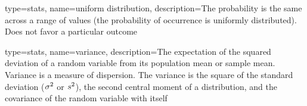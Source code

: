 {
	type=stats,
    name=uniform distribution,
    description={The probability is the same across a range of values (the probability of occurrence is uniformly distributed).  Does not favor a particular outcome}
}

{
	type=stats,
    name=variance,
    description={The expectation of the squared deviation of a random variable from its population mean or sample mean. Variance is a measure of dispersion.  The variance is the square of the standard deviation ($\mbox{$\sigma$}^2$ or $\mbox{$s$}^2$), the second central moment of a distribution, and the covariance of the random variable with itself}
} 